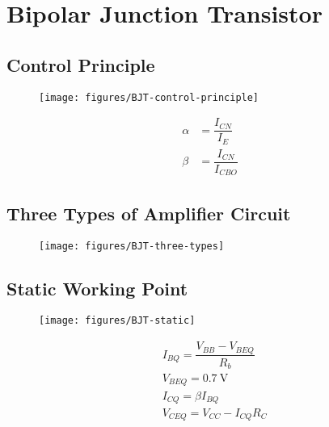 \chapter{Bipolar Junction Transistor}

\section{Control Principle}

\begin{figure}[H]
  \centering
  \texttt{[image: figures/BJT-control-principle]}
  \label{fig:}
\end{figure}

\begin{equation*}
  \begin{aligned}
    \alpha &= \dfrac{I_{CN}}{I_E} \\
    \beta &= \dfrac{I_{CN}}{I_{CBO}} 
  \end{aligned}
\end{equation*}

\section{Three Types of Amplifier Circuit}

\begin{figure}[H]
  \centering
  \texttt{[image: figures/BJT-three-types]}
  \label{fig:}
\end{figure}

\section{Static Working Point}

\begin{figure}[H]
  \centering
  \texttt{[image: figures/BJT-static]}
  \label{fig:}
\end{figure}

\begin{equation*}
  \begin{aligned}
    & I_{BQ} = \dfrac{V_{BB} - V_{BEQ}}{R_b} \\
    & V_{BEQ} = 0.7 \  \mathrm{V} \\
    & I_{CQ} = \beta I_{BQ} \\
    & V_{CEQ} = V_{CC} - I_{CQ} R_{C}
  \end{aligned}
\end{equation*}

